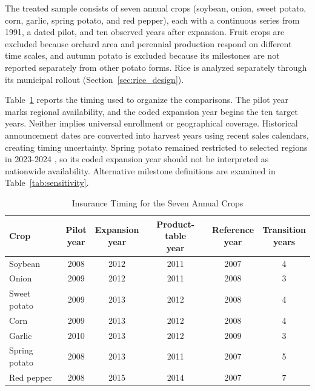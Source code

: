 The treated sample consists of seven annual crops (soybean, onion, sweet potato, corn, garlic, spring potato, and red pepper), each with a continuous series from 1991, a dated pilot, and ten observed years after expansion. Fruit crops are excluded because orchard area and perennial production respond on different time scales, and autumn potato is excluded because its milestones are not reported separately from other potato forms. Rice is analyzed separately through its municipal rollout (Section~\ref{sec:rice_design}).

Table~\ref{tab:timing} reports the timing used to organize the comparisons. The pilot year marks regional availability, and the coded expansion year begins the ten target years. Neither implies universal enrollment or geographical coverage. Historical announcement dates are converted into harvest years using recent sales calendars, creating timing uncertainty. Spring potato remained restricted to selected regions in 2023-2024 \citep{mafra2024,mafra2025}, so its coded expansion year should not be interpreted as nationwide availability. Alternative milestone definitions are examined in Table~\ref{tab:sensitivity}.

\begin{table}[htbp]
\centering
\caption{Insurance Timing for the Seven Annual Crops}\label{tab:timing}
\begin{tabular*}{\textwidth}{@{\extracolsep{\fill}}lccccc}
\toprule
Crop & \shortstack{Pilot\\year} & \shortstack{Expansion\\year} & \shortstack{Product-table\\year} & \shortstack{Reference\\year} & \shortstack{Transition\\years} \\
\midrule
Soybean       & 2008 & 2012 & 2011 & 2007 & 4 \\
Onion         & 2009 & 2012 & 2011 & 2008 & 3 \\
Sweet potato  & 2009 & 2013 & 2012 & 2008 & 4 \\
Corn          & 2009 & 2013 & 2012 & 2008 & 4 \\
Garlic        & 2010 & 2013 & 2012 & 2009 & 3 \\
Spring potato & 2008 & 2013 & 2011 & 2007 & 5 \\
Red pepper    & 2008 & 2015 & 2014 & 2007 & 7 \\
\bottomrule
\end{tabular*}
\end{table}

